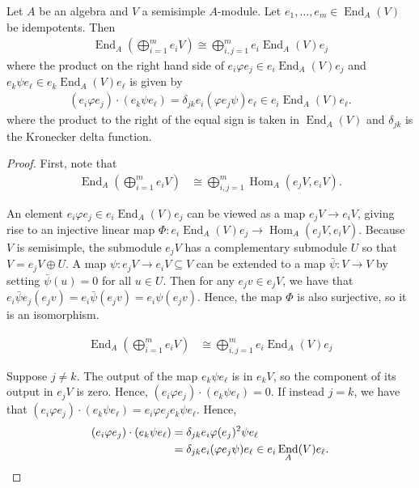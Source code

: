 \documentclass[ALCO,Unicode,published]{cedram}
\newcommand{\ov}[1]{\bar{#1}}
\DeclareMathOperator{\End}{End}
\DeclareMathOperator{\Hom}{Hom}
\begin{document}
\begin{lemma}\label{lem:decompose_by_idempotents} Let $A$ be an algebra and $V$ a semisimple $A$-module. Let $e_1,\dots,e_m\in\End_A(V)$ be idempotents. Then \begin{align*}
    \End_A\left(\bigoplus_{i=1}^me_i V\right)\cong \bigoplus_{i,j=1}^m e_i\End_A(V) e_j
\end{align*} where the product on the right hand side of $e_i\varphi e_j\in e_i\End_A(V)e_j$ and $e_k\psi e_\ell\in e_k\End_A(V)e_\ell$ is given by \begin{align*}
    (e_i\varphi e_j)\cdot(e_k\psi e_\ell)=\delta_{jk}e_i(\varphi e_j\psi)e_\ell\in e_i\End_A(V) e_\ell.
\end{align*} where the product to the right of the equal sign is taken in $\End_A(V)$ and $\delta_{jk}$ is the Kronecker delta function.
\end{lemma}

\begin{proof}
First, note that \begin{align*}
    \End_A\left(\bigoplus_{i=1}^me_i V\right)&\cong\bigoplus_{i,j=1}^m \Hom_A(e_j V, e_i V).
\end{align*}

An element $e_i\varphi e_j\in e_i\End_A(V) e_j$ can be viewed as a map $e_j V\to e_i V$, giving rise to an injective linear map $\Phi:e_i\End_A(V)e_j\to \Hom_A(e_jV, e_i V)$. Because $V$ is semisimple, the submodule $e_jV$ has a complementary submodule $U$ so that $V=e_j V\oplus U$. A map $\psi:e_j V\to e_iV\subseteq V$ can be extended to a map $\ov\psi:V\to V$ by setting $\ov\psi(u)=0$ for all $u\in U$. Then for any $e_jv\in e_jV$, we have that $e_i\ov\psi e_j(e_jv)=e_i\ov\psi(e_jv)=e_i\psi(e_jv)$. Hence, the map $\Phi$ is also surjective, so it is an isomorphism.

    \begin{align*}
        \End_A\left(\bigoplus_{i=1}^me_i V\right)&\cong\bigoplus_{i,j=1}^m e_i\End_A(V)e_j
    \end{align*}

    Suppose $j\neq k$. The output of the map $e_k\psi e_\ell$ is in $e_k V$, so the component of its output in $e_j V$ is zero. Hence, $(e_i\varphi e_j)\cdot(e_k\psi e_\ell)=0$. If instead $j=k$, we have that $(e_i\varphi e_j)\cdot(e_k\psi e_\ell)=e_i\varphi e_j e_k\psi e_\ell$. Hence, \begin{align*}
        (e_i\varphi e_j)\cdot(e_k\psi e_\ell)&=\delta_{jk}e_i\varphi (e_j)^2\psi e_\ell\\
        &=\delta_{jk}e_i(\varphi e_j\psi)e_\ell\in e_i\End_A(V) e_\ell. \qedhere
    \end{align*}
\end{proof}
\end{document}
